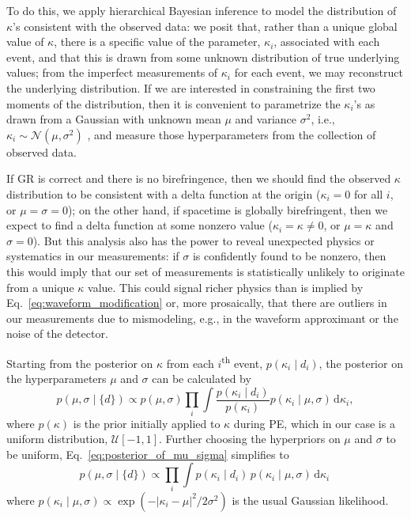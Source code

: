\documentclass[aps,prd,twocolumn,superscriptaddress,preprintnumbers,nofootinbib]{revtex4-2}
\newcommand{\infd}{\mathrm{d}}
\begin{document}
To do this, we apply hierarchical Bayesian inference \cite{Mandel2010,Hogg2010} to model the distribution of $\kappa$'s consistent with the observed data:
we posit that, rather than a unique global value of $\kappa$, there is a specific value of the parameter, $\kappa_i$, associated with each event, and that this is drawn from some unknown distribution of true underlying values; from the imperfect measurements of $\kappa_i$ for each event, we may reconstruct the underlying distribution.
If we are interested in constraining the first two moments of the distribution, then it is convenient to parametrize the $\kappa_i$'s as drawn from a Gaussian with unknown mean $\mu$ and variance $\sigma^2$, i.e., $\kappa_i \sim \mathcal{N}(\mu, \sigma^2)$ \cite{Isi:2019asy}, and measure those hyperparameters from the collection of observed data.

If \ac{GR} is correct and there is no birefringence, then we should find the observed $\kappa$ distribution to be consistent with a delta function at the origin ($\kappa_i = 0$ for all $i$, or $\mu=\sigma=0$); on the other hand, if spacetime is globally birefringent, then we expect to find a delta function at some nonzero value ($\kappa_i = \kappa \neq 0$, or $\mu = \kappa$ and $\sigma=0$).
But this analysis also has the power to reveal unexpected physics or systematics in our measurements: if $\sigma$ is confidently found to be nonzero, then this would imply that our set of measurements is statistically unlikely to originate from a unique $\kappa$ value.
This could signal richer physics than is implied by Eq.~\eqref{eq:waveform_modification} or, more prosaically, that there are outliers in our measurements due to mismodeling, e.g., in the waveform approximant or the noise of the detector.

Starting from the posterior on $\kappa$ from each $i$\textsuperscript{th} event, $p(\kappa_i\mid d_i)$, the posterior on the hyperparameters $\mu$ and $\sigma$ can be calculated by
\begin{equation}
    p(\mu,\sigma \mid \{d\})\propto p(\mu,\sigma)\prod_{i}\int\frac{p(\kappa_i\mid d_i)}{p(\kappa_i)}p(\kappa_i\mid\mu,\sigma)\,\infd\kappa_i,
    \label{eq:posterior_of_mu_sigma}
\end{equation}
where $p(\kappa)$ is the prior initially applied to $\kappa$ during \ac{PE}, which in our case is a uniform distribution, $\mathcal{U}[-1,1]$.
Further choosing the hyperpriors on $\mu$ and $\sigma$ to be uniform, Eq.~\eqref{eq:posterior_of_mu_sigma} simplifies to
\begin{equation}
    p(\mu,\sigma\mid\{d\})\propto\prod_{i}\int p(\kappa_i\mid d_i)\, p(\kappa_i\mid\mu,\sigma)\,\infd\kappa_i\,
\end{equation}
where $p(\kappa_i\mid\mu,\sigma) \propto \exp(-|\kappa_i - \mu|^2/2\sigma^2)$ is the usual Gaussian likelihood.
\end{document}
